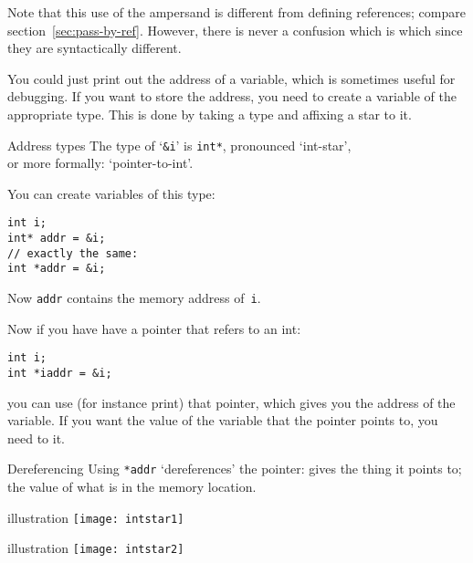 Note that this use of the ampersand is different from defining
references; compare section~\ref{sec:pass-by-ref}. However, there is
never a confusion which is which since they are syntactically
different.

You could just print out the address of a variable, which is sometimes
useful for debugging. If you want to store the address, you need to
create a variable of the appropriate type. This is done by taking a
type and affixing a star to it.

\begin{block}{Address types}
  \label{sl:intstar}
  The type of `\lstinline{&i}' is \lstinline{int*}, pronounced `int-star',\\
  or more
  formally: `pointer-to-int'.

  You can create variables of this type:
\begin{lstlisting}
int i;
int* addr = &i;
// exactly the same:
int *addr = &i;
\end{lstlisting}
Now \lstinline{addr} contains the memory address of~\lstinline{i}.
\end{block}

Now if you have have a pointer that refers to an int:
\begin{lstlisting}
int i;
int *iaddr = &i;
\end{lstlisting}
you can use (for instance print) that pointer, which gives you the
address of the variable. If you want the value of the variable that
the pointer points to, you need to  it.

\begin{block}{Dereferencing}
  \label{sl:starderef}
  Using \lstinline{*addr} `dereferences' the pointer: gives the thing it
  points to;\\
  the value of what
  is in the memory location.
\end{block}

\begin{block}{illustration}
  \label{sl:copy-pic}
  \texttt{[image: intstar1]}
\end{block}

\begin{block}{illustration}
  \label{sl:deref-pic}
  \texttt{[image: intstar2]}
\end{block}

